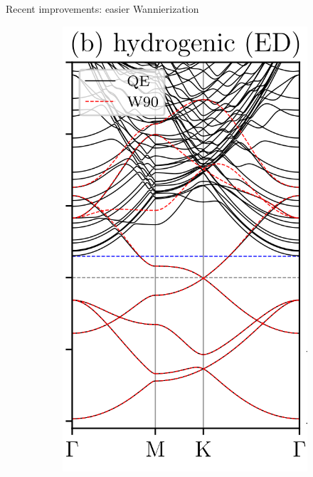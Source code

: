 \documentclass[xcolor=table,aspectratio=169]{beamer}
\numberwithin{equation}{section}
\begin{document}
\begin{frame}{Recent improvements: easier Wannierization}

   \begin{figure}[t]
      \begin{subfigure}{0.225\textwidth}
         \includegraphics[height=1.5\columnwidth]{figures/proj_disentanglement_fig1b.png}
         \vspace{-0.01\paperheight}
      \end{subfigure}
      \begin{subfigure}{0.225\textwidth}

\end{subfigure}
\end{figure}
\end{frame}
\end{document}
